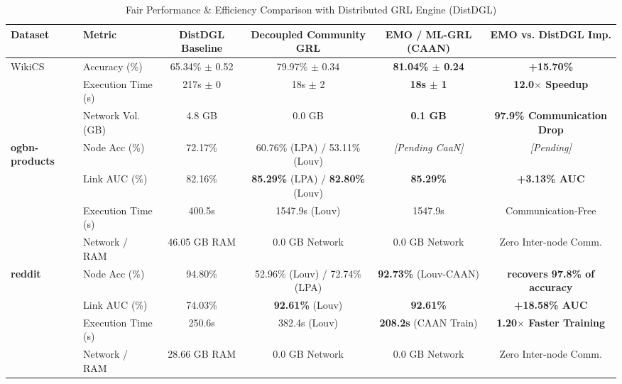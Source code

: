 \begin{table}[!t]
\renewcommand{\arraystretch}{1.2}
\caption{Fair Performance & Efficiency Comparison with Distributed GRL Engine (DistDGL)}
\label{table_distdgl_main}
\centering
\begin{tabular}{llcccc}
\toprule
\textbf{Dataset} & \textbf{Metric} & \textbf{DistDGL Baseline} & \textbf{Decoupled Community GRL} & \textbf{EMO / ML-GRL (CAAN)} & \textbf{EMO vs. DistDGL Imp.} \\
\midrule
WikiCS & Accuracy (\%) & 65.34\% $\pm$ 0.52 & 79.97\% $\pm$ 0.34 & \textbf{81.04\% $\pm$ 0.24} & \textbf{+15.70\%} \\
 & Execution Time (s) & 217s $\pm$ 0 & 18s $\pm$ 2 & \textbf{18s $\pm$ 1} & \textbf{12.0$\times$ Speedup} \\
 & Network Vol. (GB) & 4.8 GB & 0.0 GB & \textbf{0.1 GB} & \textbf{97.9\% Communication Drop} \\
\midrule
\textbf{ogbn-products} & Node Acc (\%) & 72.17\% & 60.76\% (LPA) / 53.11\% (Louv) & \emph{[Pending CaaN]} & \emph{[Pending]} \\
 & Link AUC (\%) & 82.16\% & \textbf{85.29\%} (LPA) / \textbf{82.80\%} (Louv) & \textbf{85.29\%} & \textbf{+3.13\% AUC} \\
 & Execution Time (s) & 400.5s & 1547.9s (Louv) & 1547.9s & Communication-Free \\
 & Network / RAM & 46.05 GB RAM & 0.0 GB Network & 0.0 GB Network & Zero Inter-node Comm. \\
\midrule
\textbf{reddit} & Node Acc (\%) & 94.80\% & 52.96\% (Louv) / 72.74\% (LPA) & \textbf{92.73\%} (Louv-CAAN) & \textbf{recovers 97.8\% of accuracy} \\
 & Link AUC (\%) & 74.03\% & \textbf{92.61\%} (Louv) & \textbf{92.61\%} & \textbf{+18.58\% AUC} \\
 & Execution Time (s) & 250.6s & 382.4s (Louv) & \textbf{208.2s} (CAAN Train) & \textbf{1.20$\times$ Faster Training} \\
 & Network / RAM & 28.66 GB RAM & 0.0 GB Network & 0.0 GB Network & Zero Inter-node Comm. \\
\bottomrule
\end{tabular}
\end{table}
